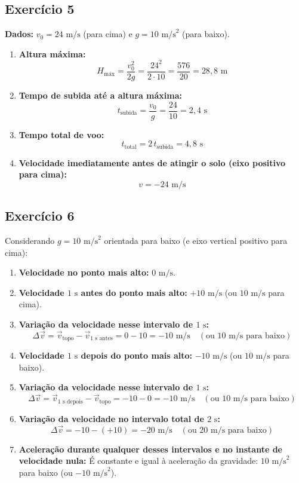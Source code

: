 \documentclass[11pt, a4paper]{article}
\begin{document}
\subsection*{Exercício 5}
\textbf{Dados:} $v_0 = 24\text{ m/s}$ (para cima) e $g = 10\text{ m/s}^2$ (para baixo).

\begin{enumerate}[label=\textbf{(\alph*)}]
    \item \textbf{Altura máxima:}
    \[
        H_{\text{máx}} = \frac{v_0^2}{2g} = \frac{24^2}{2 \cdot 10} = \frac{576}{20} = 28{,}8\text{ m}
    \]

    \item \textbf{Tempo de subida até a altura máxima:}
    \[
        t_{\text{subida}} = \frac{v_0}{g} = \frac{24}{10} = 2{,}4\text{ s}
    \]

    \item \textbf{Tempo total de voo:}
    \[
        t_{\text{total}} = 2\,t_{\text{subida}} = 4{,}8\text{ s}
    \]

    \item \textbf{Velocidade imediatamente antes de atingir o solo (eixo positivo para cima):}
    \[
        v = -24\text{ m/s}
    \]
\end{enumerate}

\subsection*{Exercício 6}
Considerando $g = 10\text{ m/s}^2$ orientada para baixo (e eixo vertical positivo para cima):

\begin{enumerate}[label=\textbf{(\alph*)}]
    \item \textbf{Velocidade no ponto mais alto:} $0\text{ m/s}$.
    \item \textbf{Velocidade $1\text{ s}$ antes do ponto mais alto:} $+10\text{ m/s}$ (ou $10\text{ m/s}$ para cima).
    \item \textbf{Variação da velocidade nesse intervalo de $1\text{ s}$:}
    \[
        \Delta \vec{v} = \vec{v}_{\text{topo}} - \vec{v}_{1\text{ s antes}} = 0 - 10 = -10\text{ m/s} \quad (\text{ou } 10\text{ m/s para baixo})
    \]
    \item \textbf{Velocidade $1\text{ s}$ depois do ponto mais alto:} $-10\text{ m/s}$ (ou $10\text{ m/s}$ para baixo).
    \item \textbf{Variação da velocidade nesse intervalo de $1\text{ s}$:}
    \[
        \Delta \vec{v} = \vec{v}_{1\text{ s depois}} - \vec{v}_{\text{topo}} = -10 - 0 = -10\text{ m/s} \quad (\text{ou } 10\text{ m/s para baixo})
    \]
    \item \textbf{Variação da velocidade no intervalo total de $2\text{ s}$:}
    \[
        \Delta \vec{v} = -10 - (+10) = -20\text{ m/s} \quad (\text{ou } 20\text{ m/s para baixo})
    \]
    \item \textbf{Aceleração durante qualquer desses intervalos e no instante de velocidade nula:}
    É constante e igual à aceleração da gravidade: $10\text{ m/s}^2$ para baixo (ou $-10\text{ m/s}^2$).
\end{enumerate}
\end{document}
